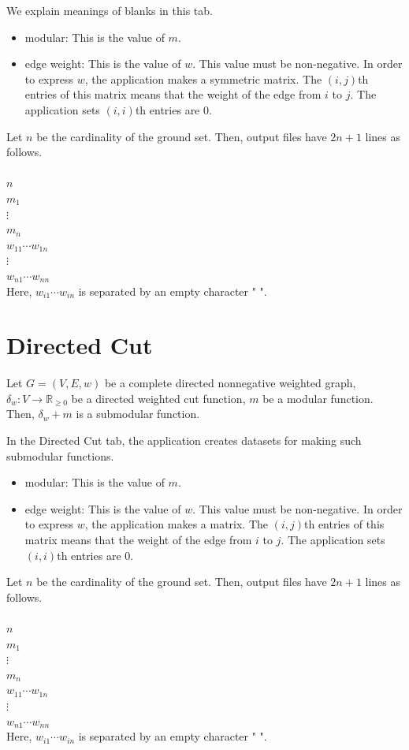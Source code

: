 \documentclass{article}
\newcommand{\re}{\mathbb{R}}
\newcommand{\modular}{modular: This is the value of $m$.
}
\newcommand{\exTab}[1]{
In the #1 tab,
the application creates datasets for making such submodular functions.}
\newcommand{\out}[1]{
Let $n$ be the cardinality of the ground set.
Then, output files have $#1$ lines as follows.\\ \mbox{}\\
}
\begin{document}
We explain meanings of blanks in this tab.
\begin{itemize}
\item \modular
\item edge weight: This is the value of $w$.
This value must be non-negative.
In order to express $w$,
the application makes a symmetric matrix.
The $(i,j)$th entries of this matrix means that the weight of the edge from $i$ to $j$.
The application sets $(i,i)$th entries are $0$.
\end{itemize}
\out{2n+1}
$n$ \\
$m_1$ \\
$\vdots$ \\
$m_n$ \\
$w_{11}  \cdots w_{1n}$ \\
\mbox{\quad \quad}$\vdots$ \\
$w_{n1} \cdots w_{nn}$ \\


Here, $w_{i1}\cdots w_{in}$ is separated by an empty character " ".


\newpage

\section{Directed Cut}\label{directedCutSec}
Let $G=(V,E,w)$ be a complete directed nonnegative weighted graph,
$\delta_w :V\rightarrow \re_{\geq 0}$ be a directed weighted cut function,
$m$ be a modular function.
Then, $\delta_w + m $ is a submodular function.
\exTab{Directed Cut}
\begin{itemize}
\item \modular
\item edge weight: This is the value of $w$.
This value must be non-negative.
In order to express $w$,
the application makes a matrix.
The $(i,j)$th entries of this matrix means that the weight of the edge from $i$ to $j$.
The application sets $(i,i)$th entries are $0$.
\end{itemize}

\out{2n+1}
$n$ \\
$m_1$ \\
$\vdots$ \\
$m_n$ \\
$w_{11}  \cdots w_{1n}$ \\
\mbox{\quad \quad}$\vdots$ \\
$w_{n1} \cdots w_{nn}$ \\

Here, $w_{i1}\cdots w_{in}$ is separated by an empty character " ".
\end{document}
